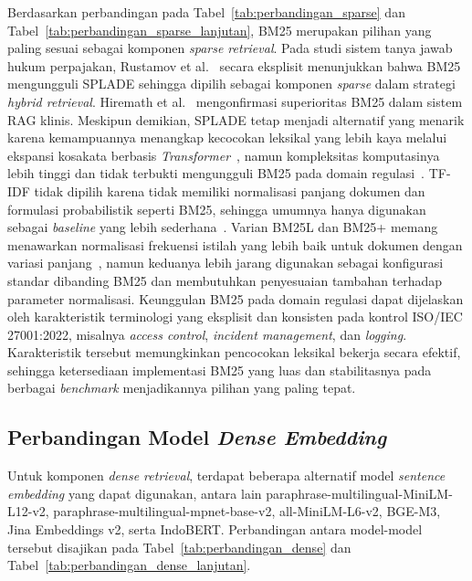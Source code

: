Berdasarkan perbandingan pada Tabel~\ref{tab:perbandingan_sparse} dan Tabel~\ref{tab:perbandingan_sparse_lanjutan}, BM25 merupakan pilihan yang paling sesuai sebagai komponen \textit{sparse retrieval}. Pada studi sistem tanya jawab hukum perpajakan, Rustamov et al.~\cite{rustamov2025tax} secara eksplisit menunjukkan bahwa BM25 mengungguli SPLADE sehingga dipilih sebagai komponen \textit{sparse} dalam strategi \textit{hybrid retrieval}. Hiremath et al.~\cite{hiremath2025ragclin} mengonfirmasi superioritas BM25 dalam sistem RAG klinis. Meskipun demikian, SPLADE tetap menjadi alternatif yang menarik karena kemampuannya menangkap kecocokan leksikal yang lebih kaya melalui ekspansi kosakata berbasis \textit{Transformer}~\cite{formal2021splade}, namun kompleksitas komputasinya lebih tinggi dan tidak terbukti mengungguli BM25 pada domain regulasi~\cite{rustamov2025tax}. TF-IDF tidak dipilih karena tidak memiliki normalisasi panjang dokumen dan formulasi probabilistik seperti BM25, sehingga umumnya hanya digunakan sebagai \textit{baseline} yang lebih sederhana~\cite{salton1988term,robertson2009probabilistic}. Varian BM25L dan BM25+ memang menawarkan normalisasi frekuensi istilah yang lebih baik untuk dokumen dengan variasi panjang~\cite{lv2011lowerbound}, namun keduanya lebih jarang digunakan sebagai konfigurasi standar dibanding BM25 dan membutuhkan penyesuaian tambahan terhadap parameter normalisasi. Keunggulan BM25 pada domain regulasi dapat dijelaskan oleh karakteristik terminologi yang eksplisit dan konsisten pada kontrol ISO/IEC 27001:2022, misalnya \textit{access control}, \textit{incident management}, dan \textit{logging}. Karakteristik tersebut memungkinkan pencocokan leksikal bekerja secara efektif, sehingga ketersediaan implementasi BM25 yang luas dan stabilitasnya pada berbagai \textit{benchmark} menjadikannya pilihan yang paling tepat.

\subsection{Perbandingan Model \textit{Dense Embedding}}

Untuk komponen \textit{dense retrieval}, terdapat beberapa alternatif model \textit{sentence embedding} yang dapat digunakan, antara lain paraphrase-multilingual-MiniLM-L12-v2, paraphrase-multilingual-mpnet-base-v2, all-MiniLM-L6-v2, BGE-M3, Jina Embeddings v2, serta IndoBERT. Perbandingan antara model-model tersebut disajikan pada Tabel~\ref{tab:perbandingan_dense} dan Tabel~\ref{tab:perbandingan_dense_lanjutan}.

